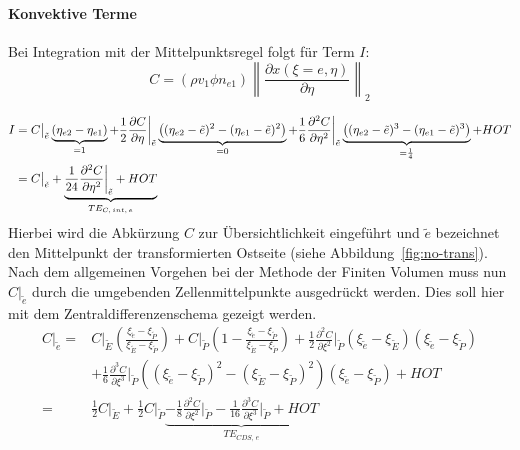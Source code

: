 \paragraph{Konvektive Terme}

\noindent
Bei Integration mit der Mittelpunktsregel folgt für Term $I$:
\begin{equation*}
  C=(\rho v_1 \phi n_{e1})
  \left\lVert \frac{\partial x(\xi=e, \eta)}{\partial \eta} \right\rVert_2
\end{equation*}

\begin{align*}
  I&= C\big\vert_{\tilde{e}} \underbrace{(\etaii-\etai)}_{=1} + \frac{1}{2} \pder[C]{\eta}\bigg\vert_{\tilde{e}}
  \underbrace{\left({(\etaii-\etilde)^2-(\etai-\etilde)^2}\right)}_{=0}
  +\frac{1}{6} \frac{\partial^2 C}{\partial \eta^2}\bigg\vert_{\tilde{e}}
  \underbrace{\left({(\etaii-\etilde)^3-(\etai-\etilde)^3}\right)}_{=\frac{1}{4}} + HOT\\
  &= C \big\vert_{\tilde{e}}+ \underbrace{\frac{1}{24}  \frac{\partial^2 C}{\partial \eta^2}
\bigg\vert_{\tilde{e}}+HOT}_{TE_{C,\,int,\,e}}
\end{align*}
Hierbei wird die Abkürzung $C$ zur Übersichtlichkeit eingeführt und $\tilde{e}$ bezeichnet den Mittelpunkt
der transformierten Ostseite (siehe Abbildung~\ref{fig:no-trans}).  Nach dem allgemeinen Vorgehen bei der
Methode der Finiten Volumen muss nun $C\vert_{\tilde{e}}$ durch die umgebenden Zellenmittelpunkte ausgedrückt werden.
Dies soll hier mit dem Zentraldifferenzenschema gezeigt werden.
\begin{align*}
   C\big\vert_{\tilde{e}}
   =& C\big\vert_{\tilde{E}}
   \left({\frac{\xi_{\tilde{e}}-\xi_{\tilde{P}}}{\xi_{\tilde{E}}-\xi_{\tilde{P}}}}\right)
   + C\big\vert_{\tilde{P}} \left({1-\frac{\xi_{\tilde{e}}-\xi_{\tilde{P}}}{\xi_{\tilde{E}}-\xi_{\tilde{P}}} }\right)
   + \frac{1}{2} \frac{\partial^2 C}{\partial \xi^2}\bigg\vert_{\tilde{P}}
   (\xi_{\tilde{e}}-\xi_{\tilde{E}})(\xi_{\tilde{e}}-\xi_{\tilde{P}})\\
   &+ \frac{1}{6}  \frac{\partial^3 C}{\partial \xi^3}\bigg\vert_{\tilde{P}}
   \left({(\xi_{\tilde{e}}-\xi_{\tilde{P}})^2-(\xi_{\tilde{E}}-\xi_{\tilde{P}})^2}\right)
   (\xi_{\tilde{e}}-\xi_{\tilde{P}}) + HOT\\
   =&\frac{1}{2} C \big\vert_{\tilde{E}} + \frac{1}{2} C \big\vert_{\tilde{P}}
   \underbrace{- \frac{1}{8} \frac{\partial^2 C}{\partial \xi^2}\bigg\vert_{\tilde{P}}
   - \frac{1}{16} \frac{\partial^3 C}{\partial \xi^3}\bigg\vert_{\tilde{P}} + HOT}_{TE_{CDS,\,e}}
\end{align*}



